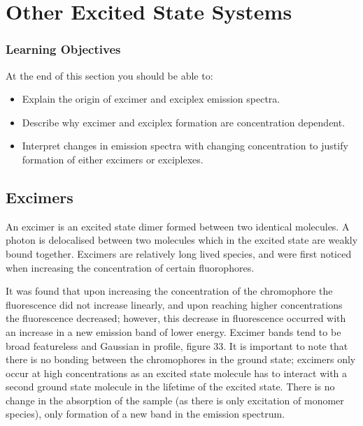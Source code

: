 \documentclass[
]{book}
\providecommand{\tightlist}{%
  \setlength{\itemsep}{0pt}\setlength{\parskip}{0pt}}
\begin{document}
\hypertarget{chexcited}{%
\chapter{Other Excited State Systems}\label{chexcited}}

\hypertarget{sec:exitedLOs}{%
\subsection{Learning Objectives}\label{sec:exitedLOs}}

At the end of this section you should be able to:

\begin{itemize}
\tightlist
\item
  Explain the origin of excimer and exciplex emission spectra.
\item
  Describe why excimer and exciplex formation are concentration dependent.
\item
  Interpret changes in emission spectra with changing concentration to justify formation of either excimers or exciplexes.
\end{itemize}

\hypertarget{sec:excimers}{%
\section{Excimers}\label{sec:excimers}}

An excimer is an excited state dimer formed between two identical molecules. A photon is delocalised between two molecules which in the excited state are weakly bound together. Excimers are relatively long lived species, and were first noticed when increasing the concentration of certain fluorophores.

It was found that upon increasing the concentration of the chromophore the fluorescence did not increase linearly, and upon reaching higher concentrations the fluorescence decreased; however, this decrease in fluorescence occurred with an increase in a new emission band of lower energy. Excimer bands tend to be broad featureless and Gaussian in profile, figure 33. It is important to note that there is no bonding between the chromophores in the ground state; excimers only occur at high concentrations as an excited state molecule has to interact with a second ground state molecule in the lifetime of the excited state. There is no change in the absorption of the sample (as there is only excitation of monomer species), only formation of a new band in the emission spectrum.
\end{document}
